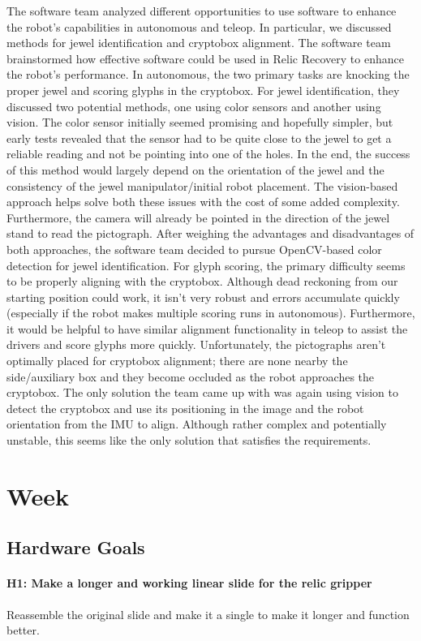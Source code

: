 \documentclass{article}
\begin{document}
The software team analyzed different opportunities to use software to enhance the robot's capabilities in autonomous and teleop. In particular, we discussed methods for jewel identification and cryptobox alignment.	The software team brainstormed how effective software could be used in Relic Recovery to enhance the robot's performance. In autonomous, the two primary tasks are knocking the proper jewel and scoring glyphs in the cryptobox. For jewel identification, they discussed two potential methods, one using color sensors and another using vision. The color sensor initially seemed promising and hopefully simpler, but early tests revealed that the sensor had to be quite close to the jewel to get a reliable reading and not be pointing into one of the holes. In the end, the success of this method would largely depend on the orientation of the jewel and the consistency of the jewel manipulator/initial robot placement. The vision-based approach helps solve both these issues with the cost of some added complexity. Furthermore, the camera will already be pointed in the direction of the jewel stand to read the pictograph. After weighing the advantages and disadvantages of both approaches, the software team decided to pursue OpenCV-based color detection for jewel identification. For glyph scoring, the primary difficulty seems to be properly aligning with the cryptobox. Although dead reckoning from our starting position could work, it isn't very robust and errors accumulate quickly (especially if the robot makes multiple scoring runs in autonomous). Furthermore, it would be helpful to have similar alignment functionality in teleop to assist the drivers and score glyphs more quickly. Unfortunately, the pictographs aren't optimally placed for cryptobox alignment; there are none nearby the side/auxiliary box and they become occluded as the robot approaches the cryptobox. The only solution the team came up with was again using vision to detect the cryptobox and use its positioning in the image and the robot orientation from the IMU to align. Although rather complex and potentially unstable, this seems like the only solution that satisfies the requirements.
\clearpage \newpage \section{Week \thesection} 
\subsection{Hardware Goals}
\paragraph{H1: Make a longer and working linear slide for the relic gripper}
Reassemble the original slide and make it a single to make it longer and function better.
\end{document}
